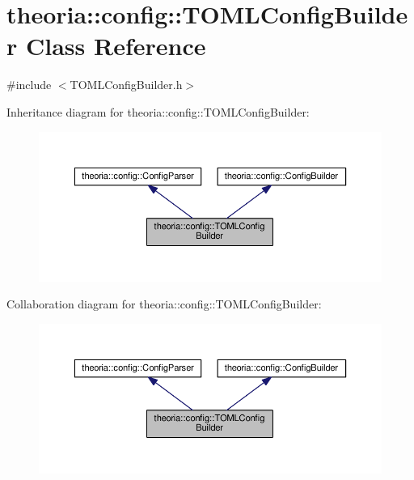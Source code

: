 \hypertarget{classtheoria_1_1config_1_1TOMLConfigBuilder}{}\section{theoria\+:\+:config\+:\+:T\+O\+M\+L\+Config\+Builder Class Reference}
\label{classtheoria_1_1config_1_1TOMLConfigBuilder}


{\ttfamily \#include $<$T\+O\+M\+L\+Config\+Builder.\+h$>$}



Inheritance diagram for theoria\+:\+:config\+:\+:T\+O\+M\+L\+Config\+Builder\+:\nopagebreak
\begin{figure}[H]
\begin{center}
\leavevmode
\includegraphics[width=350pt]{classtheoria_1_1config_1_1TOMLConfigBuilder__inherit__graph}
\end{center}
\end{figure}


Collaboration diagram for theoria\+:\+:config\+:\+:T\+O\+M\+L\+Config\+Builder\+:\nopagebreak
\begin{figure}[H]
\begin{center}
\leavevmode
\includegraphics[width=350pt]{classtheoria_1_1config_1_1TOMLConfigBuilder__coll__graph}
\end{center}
\end{figure}
